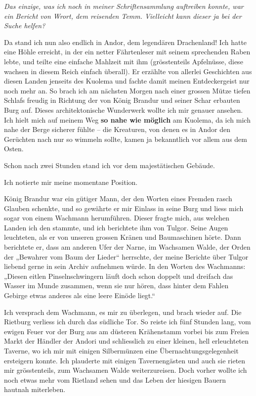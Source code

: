 \textit{Das einzige, was ich noch in meiner Schriftensammlung auftreiben konnte, war ein Bericht von Wrort, dem reisenden Temm. Vielleicht kann dieser ja bei der Suche helfen?}



\trennzeichen



Da stand ich nun also endlich in Andor, dem legendären Drachenland! Ich hatte eine Höhle erreicht, in der ein netter Fährtenleser mit seinem sprechenden Raben lebte, und teilte eine einfache Mahlzeit mit ihm (grösstenteils Apfelnüsse, diese wachsen in diesem Reich einfach überall). Er erzählte von allerlei Geschichten aus diesen Landen jenseits des Kuolema und fachte damit meinen Entdeckergeist nur noch mehr an. So brach ich am nächsten Morgen nach einer grossen Mütze tiefen Schlafs freudig in Richtung der von König Brandur und seiner Schar erbauten Burg auf. Dieses architektonische Wunderwerk wollte ich mir genauer ansehen. Ich hielt mich auf meinem Weg \textbf{so nahe wie möglich} am Kuolema, da ich mich nahe der Berge sicherer fühlte – die Kreaturen, von denen es in Andor den Gerüchten nach nur so wimmeln sollte, kamen ja bekanntlich vor allem aus dem Osten.

Schon nach zwei Stunden stand ich vor dem majestätischen Gebäude.

Ich notierte mir meine momentane Position.



\trennzeichen



König Brandur war ein gütiger Mann, der den Worten eines Fremden rasch Glauben schenkte, und so gewährte er mir Einlass in seine Burg und liess mich sogar von einem Wachmann herumführen. Dieser fragte mich, aus welchen Landen ich den stammte, und ich berichtete ihm von Tulgor. Seine Augen leuchteten, als er von unseren grossen Kränen und Baumaschinen hörte. Dann berichtete er, dass am anderen Ufer der Narne, im Wachsamen Walde, der Orden der „Bewahrer vom Baum der Lieder“ herrschte, der meine Berichte über Tulgor liebend gerne in sein Archiv aufnehmen würde. In den Worten des Wachmanns: „Diesen eitlen Pinselnschwingern läuft doch schon doppelt und dreifach das Wasser im Munde zusammen, wenn sie nur hören, dass hinter dem Fahlen Gebirge etwas anderes als eine leere Einöde liegt.“

Ich versprach dem Wachmann, es mir zu überlegen, und brach wieder auf. Die Rietburg verliess ich durch das südliche Tor. So reiste ich fünf Stunden lang, vom ewigen Feuer vor der Burg aus am düsteren Krähenstamm vorbei bis zum Freien Markt der Händler der Andori und schliesslich zu einer kleinen, hell erleuchteten Taverne, wo ich mir mit einigen Silbermünzen eine Übernachtungsgelegenheit ersteigern konnte. Ich plauderte mit einigen Tavernengästen und auch sie rieten mir grösstenteils, zum Wachsamen Walde weiterzureisen. Doch vorher wollte ich noch etwas mehr vom Rietland sehen und das Leben der hiesigen Bauern hautnah miterleben.

